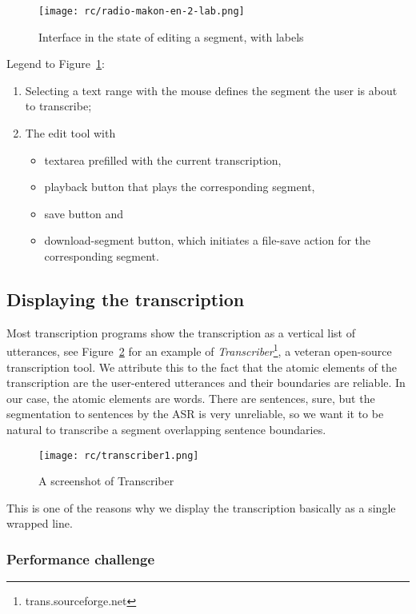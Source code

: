 \documentclass{llncs}
\begin{document}
\begin{figure}[htpb]
\texttt{[image: rc/radio-makon-en-2-lab.png]}
\caption{Interface in the state of editing a segment, with labels}
\label{fig:scn2lab}
\end{figure}

Legend to Figure~\ref{fig:scn2lab}:
\begin{enumerate}
\item{
    Selecting a text range with the mouse defines the segment the user is about
    to transcribe;
}
\item{
    The edit tool with
    \begin{itemize}
    \item{textarea prefilled with the current transcription,}
    \item{playback button that plays the corresponding segment,}
    \item{save button and}
    \item{download-segment button, which initiates a file-save action for the
    corresponding segment.}
    \end{itemize}
}
\end{enumerate}

\subsection{Displaying the transcription}

Most transcription programs show the transcription as a vertical list of
utterances, see Figure~\ref{fig:transcriber1} for an example of
{\em{Transcriber}}\footnote{trans.sourceforge.net}, a veteran open-source
transcription tool. We attribute this to the fact that the atomic elements of
the transcription are the user-entered utterances and their boundaries are
reliable. In our case, the atomic elements are words. There are sentences, sure,
but the segmentation to sentences by the ASR is very unreliable, so we want it
to be natural to transcribe a segment overlapping sentence boundaries.

\begin{figure}[htpb]
\texttt{[image: rc/transcriber1.png]}
\caption{A screenshot of Transcriber}
\label{fig:transcriber1}
\end{figure}

This is one of the reasons why we display the transcription basically as a
single wrapped line.

\subsubsection{Performance challenge}
\end{document}
